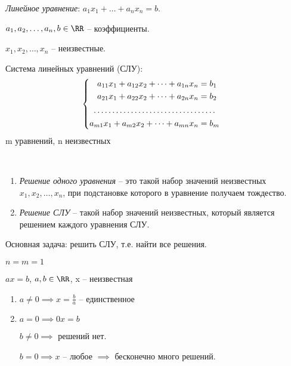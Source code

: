 \textit{Линейное уравнение}: $a_1 x_1 + \dots + a_n x_n = b$.

$a_1, a_2, \dots, a_n, b \in \RR$ -- коэффициенты.

$x_1, x_2, \dots, x_n$ -- неизвестные.

\bigskip
Система линейных уравнений (СЛУ):
\begin{equation*}
    \begin{cases}
        \begin{aligned}
            a_{11} x_1 + a_{12} x_2 + \cdots + a_{1n} x_n &= b_1 \\
            a_{21} x_1 + a_{22} x_2 + \cdots + a_{2n} x_n &= b_2 \\
            \hdotsfor{2} \\
            a_{m1} x_1 + a_{m2} x_2 + \cdots + a_{mn} x_n &= b_m \\
        \end{aligned}
    \end{cases}
\end{equation*}
m уравнений, n неизвестных

\begin{definition}~
    \begin{enumerate}
    \item \textit{Решение одного уравнения} -- это такой набор значений неизвестных $x_1, x_2, \dots, x_n$, при подстановке которого в уравнение получаем тождество.
    \item \textit{Решение СЛУ} -- такой набор значений неизвестных, который является решением каждого уравнения СЛУ.
    \end{enumerate}
\end{definition}

Основная задача: решить СЛУ, т.е. найти все решения.

\bigskip
\begin{example}

    $n = m = 1$

    $ax = b$, $a, b \in \RR$, x -- неизвестная

    \begin{enumerate}
    \item $a \neq 0 \implies x = \frac{b}{a}$ -- единственное

    \item $a = 0 \implies 0x = b$

        $b \neq 0 \implies$ решений нет.

        $b = 0 \implies x$ -- любое $\implies$ бесконечно много решений.
    \end{enumerate}
\end{example}

